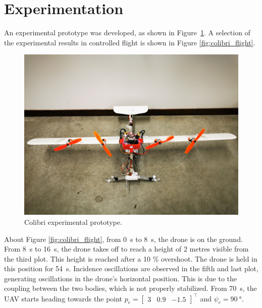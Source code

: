 \section{Experimentation}
\label{sec:exp}
An experimental prototype was developed, as shown in Figure~\ref{fig:colibri_real}. A selection of the experimental results in controlled flight is shown in Figure \ref{fig:colibri_flight}.\\
\begin{figure}[!h]
    \centering
    \includegraphics[trim={0 15cm 0 25cm},clip, width=\columnwidth]{figures/colibri_real.jpg}
    \caption{Colibri experimental prototype.}
    \label{fig:colibri_real}
\end{figure}
About Figure \ref{fig:colibri_flight}, from \SI{0}{\second} to \SI{8}{\second}, the drone is on the ground. From \SI{8}{\second} to \SI{16}{\second}, the drone takes off to reach a height of 2 metres visible from the third plot. This height is reached after a 10 \% overshoot. The drone is held in this position for \SI{54}{\second}. Incidence oscillations are observed in the fifth and last plot, generating oscillations in the drone's horizontal position. This is due to the coupling between the two bodies, which is not properly stabilized. From \SI{70}{\second}, the UAV starts heading towards the point $p_{c} = \begin{bmatrix} 3 & 0.9 & -1.5 \end{bmatrix}^\top$ and $\psi_{c}=\SI{90}{\degree}$.
